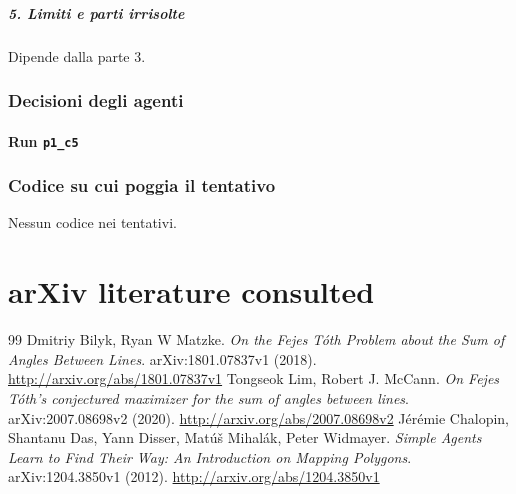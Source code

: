 \documentclass[11pt,a4paper]{article}
\begin{document}
\subparagraph{5. Limiti e parti
irrisolte}\label{limiti-e-parti-irrisolte}

Dipende dalla parte 3.

\subsubsection{Decisioni degli agenti}
\paragraph{Run \texttt{p1\_c5}}

\subsubsection{Codice su cui poggia il tentativo}
Nessun codice nei tentativi.

\section{arXiv literature consulted}
\begin{thebibliography}{99}
 Dmitriy Bilyk, Ryan W Matzke. \emph{On the Fejes Tóth Problem about the Sum of Angles Between Lines}. arXiv:1801.07837v1 (2018). \url{http://arxiv.org/abs/1801.07837v1}
 Tongseok Lim, Robert J. McCann. \emph{On Fejes Tóth's conjectured maximizer for the sum of angles between lines}. arXiv:2007.08698v2 (2020). \url{http://arxiv.org/abs/2007.08698v2}
 Jérémie Chalopin, Shantanu Das, Yann Disser, Matúš Mihalák, Peter Widmayer. \emph{Simple Agents Learn to Find Their Way: An Introduction on Mapping Polygons}. arXiv:1204.3850v1 (2012). \url{http://arxiv.org/abs/1204.3850v1}
\end{thebibliography}
\end{document}
